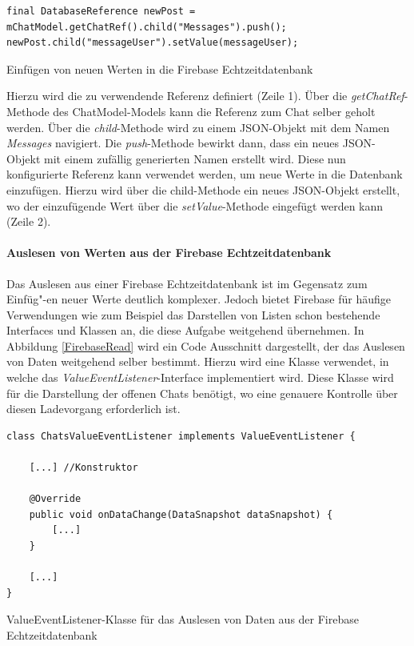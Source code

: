 \documentclass[../main.tex]{subfiles}
\begin{document}
\begin{code}
	\begin{center}
		\begin{verbatim}
final DatabaseReference newPost = mChatModel.getChatRef().child("Messages").push();
newPost.child("messageUser").setValue(messageUser);
		\end{verbatim}
		\caption{Einfügen von neuen Werten in die Firebase Echtzeitdatenbank}
		\label{FirebaseWrite}
	\end{center}
\end{code}
	
	Hierzu wird die zu verwendende Referenz definiert (Zeile 1). Über die \emph{getChatRef}-Methode des ChatModel-Models kann die Referenz zum Chat selber geholt werden. Über die \emph{child}-Methode wird zu einem JSON-Objekt mit dem Namen \emph{Messages} navigiert. Die \emph{push}-Methode bewirkt dann, dass ein neues JSON-Objekt mit einem zufällig generierten Namen erstellt wird. Diese nun konfigurierte Referenz kann verwendet werden, um neue Werte in die Datenbank einzufügen. Hierzu wird über die child-Methode ein neues JSON-Objekt erstellt, wo der einzufügende Wert über die \emph{setValue}-Methode eingefügt werden kann (Zeile 2). %
	
	\paragraph{Auslesen von Werten aus der Firebase Echtzeitdatenbank}
	Das Auslesen aus einer Firebase Echtzeitdatenbank ist im Gegensatz zum Einfüg"-en neuer Werte deutlich komplexer. Jedoch bietet Firebase für häufige Verwendungen wie zum Beispiel das Darstellen von Listen schon bestehende Interfaces und Klassen an, die diese Aufgabe weitgehend übernehmen. In Abbildung \ref{FirebaseRead} wird ein Code Ausschnitt dargestellt, der das Auslesen von Daten weitgehend selber bestimmt. Hierzu wird eine Klasse verwendet, in welche das \emph{ValueEventListener}-Interface implementiert wird. Diese Klasse wird für die Darstellung der offenen Chats benötigt, wo eine genauere Kontrolle über diesen Ladevorgang erforderlich ist.
	
\begin{code}
	\begin{center}
		\begin{verbatim}
class ChatsValueEventListener implements ValueEventListener {
	
	[...] //Konstruktor
	
	@Override
	public void onDataChange(DataSnapshot dataSnapshot) {
		[...]
	}

	[...]
}
		\end{verbatim}
		\caption{ValueEventListener-Klasse für das Auslesen von Daten aus der Firebase Echtzeitdatenbank}
		\label{FirebaseRead}
	\end{center}
\end{code}
\end{document}
